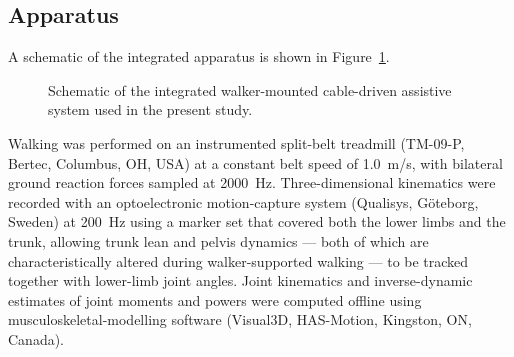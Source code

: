 \documentclass[11pt,a4paper]{article}
\begin{document}
\subsection{Apparatus}
A schematic of the integrated apparatus is shown in Figure~\ref{fig:setup}.

\begin{figure}[t]
  \centering
  \caption{Schematic of the integrated walker-mounted cable-driven assistive system used in the present study.}
  \label{fig:setup}
\end{figure}

Walking was performed on an instrumented split-belt treadmill (TM-09-P, Bertec, Columbus, OH, USA) at a constant belt speed of 1.0~m/s, with bilateral ground reaction forces sampled at 2000~Hz. Three-dimensional kinematics were recorded with an optoelectronic motion-capture system (Qualisys, Göteborg, Sweden) at 200~Hz using a marker set that covered both the lower limbs and the trunk, allowing trunk lean and pelvis dynamics — both of which are characteristically altered during walker-supported walking — to be tracked together with lower-limb joint angles. Joint kinematics and inverse-dynamic estimates of joint moments and powers were computed offline using musculoskeletal-modelling software (Visual3D, HAS-Motion, Kingston, ON, Canada).
\end{document}
